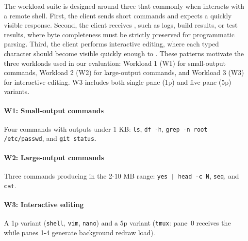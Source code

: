 The workload suite is designed around three  that commonly  when  interacts with a remote shell. First, the client sends short commands and expects a quickly visible response. Second, the client receives , such as logs, build results, or test results, where byte completeness must be strictly preserved for programmatic parsing. Third, the client performs interactive editing, where each typed character should become visible quickly enough to . These patterns motivate the three workloads used in our evaluation: Workload 1 (W1) for small-output commands, Workload 2 (W2) for large-output commands, and Workload 3 (W3) for interactive editing. W3 includes both single-pane (1p) and five-pane (5p) variants.

\paragraph{W1: Small-output commands}
Four commands with outputs under 1 KB: \texttt{ls}, \texttt{df -h}, \texttt{grep -n root /etc/passwd}, and \texttt{git status}.

\paragraph{W2: Large-output commands}
Three commands producing  in the 2-10 MB range: \texttt{yes | head -c N}, \texttt{seq}, and \texttt{cat}.

\paragraph{W3: Interactive editing}
A 1p variant (\texttt{shell}, \texttt{vim}, \texttt{nano}) and a 5p variant (\texttt{tmux}: pane~0 receives the  while panes 1-4 generate background redraw load).


